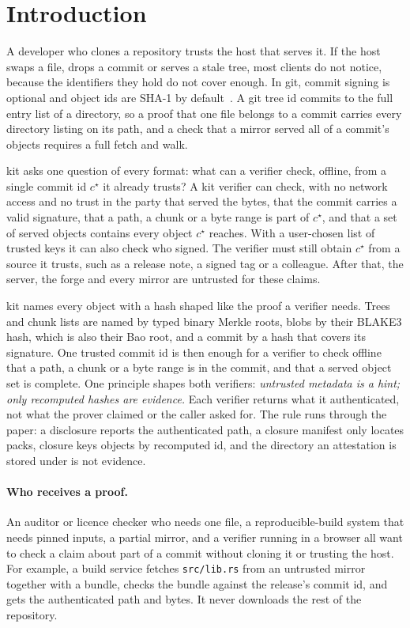 \documentclass[10pt,letterpaper]{article}
\theoremstyle{remark}
\newcommand{\kit}{\textsf{kit}}
\begin{document}
\section{Introduction}\label{sec:intro}

A developer who clones a repository trusts the host that serves it. If the
host swaps a file, drops a commit or serves a stale tree, most clients do not
notice, because the identifiers they hold do not cover enough. In git, commit
signing is optional and object ids are SHA-1 by default~\cite{git}. A git tree
id commits to the full entry list of a directory, so a proof that one file
belongs to a commit carries every directory listing on its path, and a check
that a mirror served all of a commit's objects requires a full fetch and walk.

\kit{} asks one question of every format: what can a verifier check, offline,
from a single commit id $c^\star$ it already trusts? A \kit{} verifier can
check, with no network access and no trust in the party that served the bytes,
that the commit carries a valid signature, that a path, a chunk or a byte range
is part of $c^\star$, and that a set of served objects contains every object
$c^\star$ reaches. With a user-chosen list of trusted keys it can also check
who signed. The verifier must still obtain $c^\star$ from a source it trusts,
such as a release note, a signed tag or a colleague. After that, the server,
the forge and every mirror are untrusted for these claims.

\kit{} names every object with a hash shaped like the proof a verifier needs.
Trees and chunk lists are named by typed binary Merkle roots, blobs by their
BLAKE3 hash, which is also their Bao root, and a commit by a hash that covers
its signature. One trusted commit id is then enough for a verifier to check
offline that a path, a chunk or a byte range is in the commit, and that a
served object set is complete. One principle shapes both verifiers:
\emph{untrusted metadata is a hint; only recomputed hashes are evidence.} Each
verifier returns what it authenticated, not what the prover claimed or the
caller asked for. The rule runs through the paper: a disclosure reports the
authenticated path, a closure manifest only locates packs, closure keys objects
by recomputed id, and the directory an attestation is stored under is not
evidence.

\paragraph{Who receives a proof.}
An auditor or licence checker who needs one file, a reproducible-build system
that needs pinned inputs, a partial mirror, and a verifier running in a browser
all want to check a claim about part of a commit without cloning it or
trusting the host. For example, a build service fetches \texttt{src/lib.rs}
from an untrusted mirror together with a bundle, checks the bundle against the
release's commit id, and gets the authenticated path and bytes. It never
downloads the rest of the repository.
\end{document}
